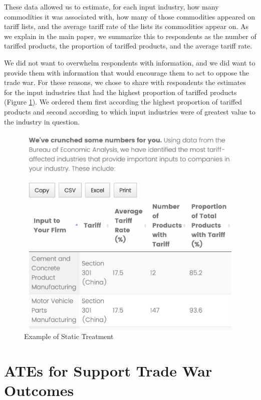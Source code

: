 These data allowed us to estimate, for each input industry, how many commodities it was associated with, how many of those commodities appeared on tariff lists, and the average tariff rate of the lists its commodities appear on. As we explain in the main paper, we summarize this to respondents as the number of tariffed products, the proportion of tariffed products, and the average tariff rate.

We did not want to overwhelm respondents with information, and we did want to provide them with information that would encourage them to act to oppose the trade war. For these reasons, we chose to share with respondents the estimates for the input industries that had the highest proportion of tariffed products (Figure \ref{fig:treatment_pic}). We ordered them first according the highest proportion of tariffed products and second according to which input industries were of greatest value to the industry in question.

\begin{figure}
    \centering
\includegraphics[scale=.4]{treatment_pic.png}
    \caption{Example of Static Treatment}
    \label{fig:treatment_pic}
\end{figure}

\section{ATEs for Support Trade War Outcomes}

